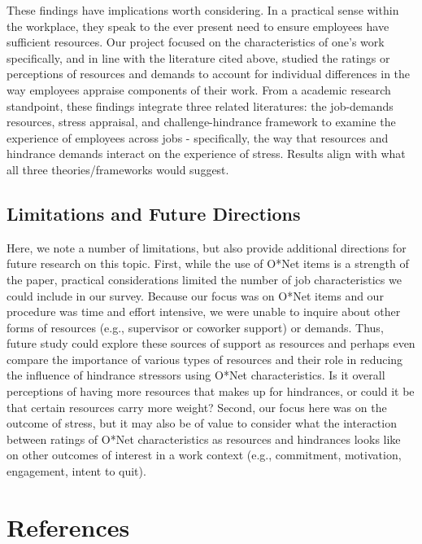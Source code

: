 \documentclass[
  english,
  man]{apa6}
\begin{document}
These findings have implications worth considering. In a practical sense within the workplace, they speak to the ever present need to ensure employees have sufficient resources. Our project focused on the characteristics of one's work specifically, and in line with the literature cited above, studied the ratings or perceptions of resources and demands to account for individual differences in the way employees appraise components of their work. From a academic research standpoint, these findings integrate three related literatures: the job-demands resources, stress appraisal, and challenge-hindrance framework to examine the experience of employees across jobs - specifically, the way that resources and hindrance demands interact on the experience of stress. Results align with what all three theories/frameworks would suggest.

\hypertarget{limitations-and-future-directions}{%
\subsection{Limitations and Future Directions}\label{limitations-and-future-directions}}

Here, we note a number of limitations, but also provide additional directions for future research on this topic. First, while the use of O*Net items is a strength of the paper, practical considerations limited the number of job characteristics we could include in our survey. Because our focus was on O*Net items and our procedure was time and effort intensive, we were unable to inquire about other forms of resources (e.g., supervisor or coworker support) or demands. Thus, future study could explore these sources of support as resources and perhaps even compare the importance of various types of resources and their role in reducing the influence of hindrance stressors using O*Net characteristics. Is it overall perceptions of having more resources that makes up for hindrances, or could it be that certain resources carry more weight? Second, our focus here was on the outcome of stress, but it may also be of value to consider what the interaction between ratings of O*Net characteristics as resources and hindrances looks like on other outcomes of interest in a work context (e.g., commitment, motivation, engagement, intent to quit).

\newpage

\hypertarget{references}{%
\section{References}\label{references}}
\end{document}
